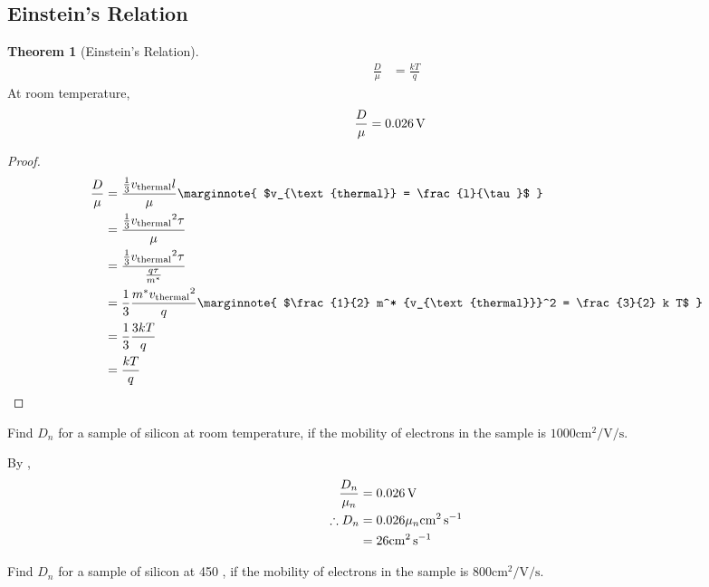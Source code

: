 \documentclass[titlepage, fleqn, a4paper, 12pt, twoside]{article}
\theoremstyle{definition}
\theoremstyle{theorem}
\newtheorem{theorem}{Theorem}
\begin{document}
\subsection{Einstein's Relation}

\begin{theorem}[Einstein's Relation]
	\begin{align*}
		\frac{D}{\mu} &= \frac{k T}{q}
	\end{align*}
	At room temperature,
	\begin{align*}
		\frac{D}{\mu} &= 0.026 \volt
	\end{align*}
	\label{Einstein's_Relation}
\end{theorem}

\begin{proof}
	\begin{align*}
		\frac{D}{\mu} &= \frac{\frac{1}{3} v_{\text{thermal}} l}{\mu}
		\marginnote
		{
			$v_{\text{thermal}} = \frac{l}{\tau}$
		}\\
		&= \frac{\frac{1}{3} {v_{\text{thermal}}}^2 \tau}{\mu}\\
		&= \frac{\frac{1}{3} {v_{\text{thermal}}}^2 \tau}{\frac{q \tau}{m^*}}\\
		&= \frac{1}{3} \frac{m^* {v_{\text{thermal}}}^2}{q}
		\marginnote
		{
			$\frac{1}{2} m^* {v_{\text{thermal}}}^2 = \frac{3}{2} k T$
		}\\
		&= \frac{1}{3} \frac{3 k T}{q}\\
		&= \frac{k T}{q}
	\end{align*}
\end{proof}

\begin{question}
	Find $D_n$ for a sample of silicon at room temperature, if the mobility of electrons in the sample is $1000 \si{\centi\metre\squared\per\volt\per\second}$.
\end{question}

\begin{solution}
	By ,
	\begin{align*}
		\frac{D_n}{\mu_n} &= 0.026 \volt\\
		\therefore D_n &= 0.026 \mu_n \si{\centi\metre\squared\per\second}\\
		&= 26 \si{\centi\metre\squared\per\second}
	\end{align*}
\end{solution}

\begin{question}
	Find $D_n$ for a sample of silicon at 450 \kelvin, if the mobility of electrons in the sample is $800 \si{\centi\metre\squared\per\volt\per\second}$.
\end{question}
\end{document}
